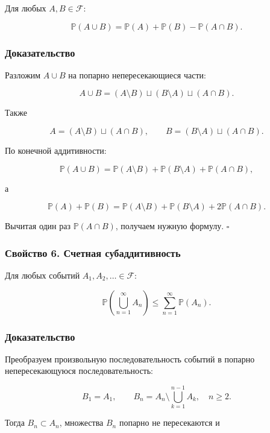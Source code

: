\documentclass[
  11pt,
  a4paper,
]{article}
\begin{document}
Для любых \(A,B\in\mathcal F\):

\[
\mathbb P(A\cup B)=\mathbb P(A)+\mathbb P(B)-\mathbb P(A\cap B).
\]

\subsubsection{Доказательство}\label{ux434ux43eux43aux430ux437ux430ux442ux435ux43bux44cux441ux442ux432ux43e-4}

Разложим \(A\cup B\) на попарно непересекающиеся части:

\[
A\cup B=(A\setminus B)\sqcup(B\setminus A)\sqcup(A\cap B).
\]

Также

\[
A=(A\setminus B)\sqcup(A\cap B),
\qquad
B=(B\setminus A)\sqcup(A\cap B).
\]

По конечной аддитивности:

\[
\mathbb P(A\cup B)
=
\mathbb P(A\setminus B)+\mathbb P(B\setminus A)+\mathbb P(A\cap B),
\]

а

\[
\mathbb P(A)+\mathbb P(B)
=
\mathbb P(A\setminus B)+\mathbb P(B\setminus A)+2\mathbb P(A\cap B).
\]

Вычитая один раз \(\mathbb P(A\cap B)\), получаем нужную формулу.
\(\square\)

\subsubsection{Свойство 6. Счетная
субаддитивность}\label{ux441ux432ux43eux439ux441ux442ux432ux43e-6.-ux441ux447ux435ux442ux43dux430ux44f-ux441ux443ux431ux430ux434ux434ux438ux442ux438ux432ux43dux43eux441ux442ux44c}

Для любых событий \(A_1,A_2,\ldots\in\mathcal F\):

\[
\mathbb P\left(\bigcup_{n=1}^{\infty}A_n\right)
\le
\sum_{n=1}^{\infty}\mathbb P(A_n).
\]

\subsubsection{Доказательство}\label{ux434ux43eux43aux430ux437ux430ux442ux435ux43bux44cux441ux442ux432ux43e-5}

Преобразуем произвольную последовательность событий в попарно
непересекающуюся последовательность:

\[
B_1=A_1,\qquad
B_n=A_n\setminus\bigcup_{k=1}^{n-1}A_k,\quad n\ge2.
\]

Тогда \(B_n\subset A_n\), множества \(B_n\) попарно не пересекаются и
\end{document}

